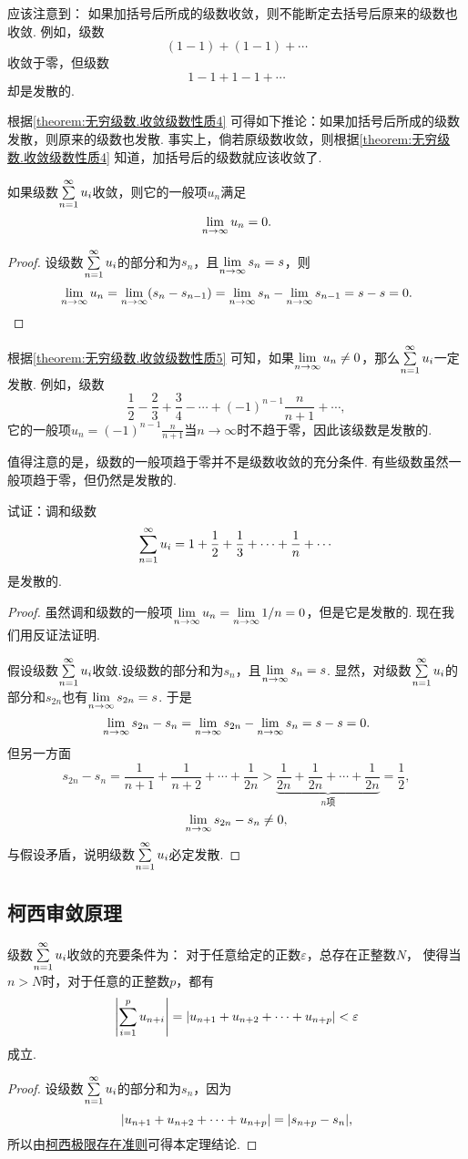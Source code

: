 应该注意到：
如果加括号后所成的级数收敛，则不能断定去括号后原来的级数也收敛.
例如，级数\[
(1-1)+(1-1)+\dotsb
\]收敛于零，但级数\[
1-1+1-1+\dotsb
\]却是发散的.

根据\cref{theorem:无穷级数.收敛级数性质4} 可得如下推论：{\color{red}如果加括号后所成的级数发散，则原来的级数也发散.}
事实上，倘若原级数收敛，则根据\cref{theorem:无穷级数.收敛级数性质4} 知道，加括号后的级数就应该收敛了.

\begin{property}[级数收敛的必要条件]\label{theorem:无穷级数.收敛级数性质5}
如果级数\(\sum\limits_{n=1}^\infty u_i\)收敛，则它的一般项\(u_n\)满足\[
\lim\limits_{n\to\infty} u_n = 0.
\]
\begin{proof}
设级数\(\sum\limits_{n=1}^\infty u_i\)的部分和为\(s_n\)，且\(\lim\limits_{n\to\infty} s_n = s\)，则\[
\lim\limits_{n\to\infty} u_n = \lim\limits_{n\to\infty}(s_n - s_{n-1}) = \lim\limits_{n\to\infty} s_n - \lim\limits_{n\to\infty} s_{n-1} = s - s = 0.
\qedhere
\]
\end{proof}
\end{property}

根据\cref{theorem:无穷级数.收敛级数性质5} 可知，如果\(\lim\limits_{n\to\infty} u_n \neq 0\)，那么\(\sum\limits_{n=1}^\infty u_i\)一定发散.
例如，级数\[
\frac{1}{2}-\frac{2}{3}+\frac{3}{4}-\dotsb+(-1)^{n-1}\frac{n}{n+1}+\dotsb,
\]它的一般项\(u_n = (-1)^{n-1} \frac{n}{n+1}\)当\(n\to\infty\)时不趋于零，因此该级数是发散的.

值得注意的是，级数的一般项趋于零并不是级数收敛的充分条件.
有些级数虽然一般项趋于零，但仍然是发散的.
\begin{example}\label{example:无穷级数.调和级数的收敛性}
试证：调和级数\[
\sum\limits_{n=1}^\infty u_i = 1+\frac{1}{2}+\frac{1}{3}+\dotsb+\frac{1}{n}+\dotsb
\]是发散的.
\begin{proof}
虽然调和级数的一般项\(\lim\limits_{n\to\infty} u_n = \lim\limits_{n\to\infty} 1/n = 0\)，但是它是发散的.
现在我们用反证法证明.

假设级数\(\sum\limits_{n=1}^\infty u_i\)收敛.设级数的部分和为\(s_n\)，且\(\lim\limits_{n\to\infty} s_n = s\).
显然，对级数\(\sum\limits_{n=1}^\infty u_i\)的部分和\(s_{2n}\)也有\(\lim\limits_{n\to\infty} s_{2n} = s\).
于是\[
\lim\limits_{n\to\infty} {s_{2n}-s_n} = \lim\limits_{n\to\infty} s_{2n} - \lim\limits_{n\to\infty} s_n = s - s = 0.
\]但另一方面\[
s_{2n} - s_n = \frac{1}{n+1}+\frac{1}{n+2}+\dotsb+\frac{1}{2n}
> \underbrace{\frac{1}{2n}+\frac{1}{2n}+\dotsb+\frac{1}{2n}}_{n\text{项}}
= \frac{1}{2},
\]\[
\lim\limits_{n\to\infty} {s_{2n}-s_n} \neq 0,
\]与假设矛盾，说明级数\(\sum\limits_{n=1}^\infty u_i\)必定发散.
\end{proof}
\end{example}

\subsection{柯西审敛原理}
\begin{theorem}[柯西审敛原理]\label{theorem:无穷级数.级数的柯西审敛原理}
级数\(\sum\limits_{n=1}^\infty u_i\)收敛的充要条件为：
对于任意给定的正数\(\varepsilon\)，总存在正整数\(N\)，
使得当\(n>N\)时，对于任意的正整数\(p\)，都有\[
\abs{ \sum\limits_{i=1}^p u_{n+i} }
= \abs{u_{n+1}+u_{n+2}+\dotsb+u_{n+p}}
< \varepsilon
\]成立.
\begin{proof}
设级数\(\sum\limits_{n=1}^\infty u_i\)的部分和为\(s_n\)，因为\[
\abs{u_{n+1}+u_{n+2}+\dotsb+u_{n+p}} = \abs{s_{n+p}-s_n},
\]所以由\hyperref[theorem:极限.数列的柯西极限存在准则]{柯西极限存在准则}可得本定理结论.
\end{proof}
\end{theorem}

